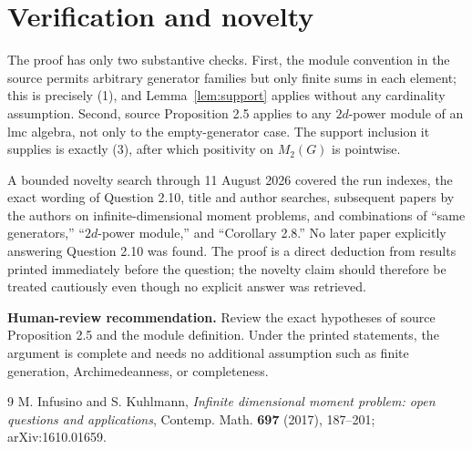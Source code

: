 \documentclass[11pt]{article}
\begin{document}
\section{Verification and novelty}

The proof has only two substantive checks.  First, the module convention in
the source permits arbitrary generator families but only finite sums in each
element; this is precisely (1), and Lemma~\ref{lem:support} applies without
any cardinality assumption.  Second, source Proposition 2.5 applies to any
$2d$-power module of an lmc algebra, not only to the empty-generator case.
The support inclusion it supplies is exactly (3), after which positivity on
$M_2(G)$ is pointwise.

A bounded novelty search through 11 August 2026 covered the run indexes, the
exact wording of Question 2.10, title and author searches, subsequent papers
by the authors on infinite-dimensional moment problems, and combinations of
``same generators,'' ``$2d$-power module,'' and ``Corollary 2.8.''  No later
paper explicitly answering Question 2.10 was found.  The proof is a direct
deduction from results printed immediately before the question; the novelty
claim should therefore be treated cautiously even though no explicit answer
was retrieved.

\medskip
\noindent\textbf{Human-review recommendation.} Review the exact hypotheses of
source Proposition 2.5 and the module definition.  Under the printed
statements, the argument is complete and needs no additional assumption such
as finite generation, Archimedeanness, or completeness.

\begin{thebibliography}{9}
M. Infusino and S. Kuhlmann,
\emph{Infinite dimensional moment problem: open questions and applications},
Contemp. Math. \textbf{697} (2017), 187--201; arXiv:1610.01659.
\end{thebibliography}
\end{document}
